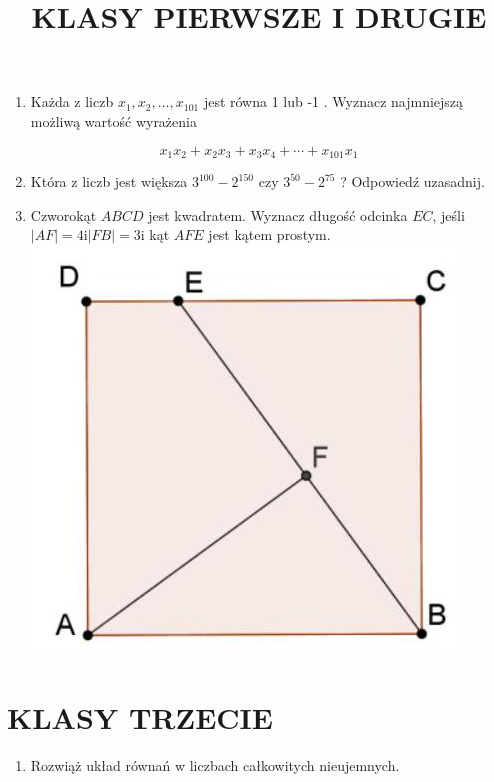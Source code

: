 \documentclass[10pt]{article}
\title{KLASY PIERWSZE I DRUGIE }
\author{}
\date{}
\begin{document}
\maketitle
\begin{enumerate}
  \item Każda z liczb \(x_{1}, x_{2}, \ldots, x_{101}\) jest równa 1 lub -1 . Wyznacz najmniejszą możliwą wartość wyrażenia
\end{enumerate}

\[
x_{1} x_{2}+x_{2} x_{3}+x_{3} x_{4}+\cdots+x_{101} x_{1}
\]

\begin{enumerate}
  \setcounter{enumi}{1}
  \item Która z liczb jest większa \(3^{100}-2^{150}\) czy \(3^{50}-2^{75}\) ? Odpowiedź uzasadnij.
  \item Czworokąt \(A B C D\) jest kwadratem. Wyznacz długość odcinka \(E C\), jeśli \(|A F|=4 \mathrm{i}|F B|=3 \mathrm{i}\) kąt \(A F E\) jest kątem prostym.\\
\includegraphics[max width=\textwidth, center]{2024_11_21_cb743ddb4cacb96e214dg-1(1)}
\end{enumerate}

\section*{KLASY TRZECIE}
\begin{enumerate}
  \item Rozwiąż układ równań w liczbach całkowitych nieujemnych.
\end{enumerate}
\end{document}
